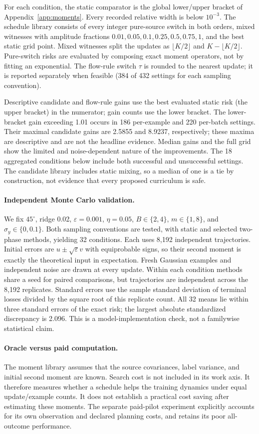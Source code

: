 For each condition, the static comparator is the global lower/upper bracket of Appendix~\ref{app:moments}. Every recorded relative width is below $10^{-3}$. The schedule library consists of every integer pure-source switch in both orders, mixed witnesses with amplitude fractions $0.01,0.05,0.1,0.25,0.5,0.75,1$, and the best static grid point. Mixed witnesses split the updates as $\lfloor K/2\rfloor$ and $K-\lfloor K/2\rfloor$. Pure-switch risks are evaluated by composing exact moment operators, not by fitting an exponential. The flow-rule switch $\tau$ is rounded to the nearest update; it is reported separately when feasible (384 of 432 settings for each sampling convention).

Descriptive candidate and flow-rule gains use the best evaluated static risk (the upper bracket) in the numerator; gain counts use the lower bracket. The lower-bracket gain exceeding 1.01 occurs in 186 per-example and 220 per-batch settings. Their maximal candidate gains are 2.5855 and 8.9237, respectively; these maxima are descriptive and are not the headline evidence. Median gains and the full grid show the limited and noise-dependent nature of the improvements. The 18 aggregated conditions below include both successful and unsuccessful settings. The candidate library includes static mixing, so a median of one is a tie by construction, not evidence that every proposed curriculum is safe.


\paragraph{Independent Monte Carlo validation.}
We fix $45^\circ$, ridge 0.02, $\varepsilon=0.001$, $\eta=0.05$, $B\in\{2,4\}$, $m\in\{1,8\}$, and $\sigma_y\in\{0,0.1\}$. Both sampling conventions are tested, with static and selected two-phase methods, yielding 32 conditions. Each uses 8,192 independent trajectories. Initial errors are $u\pm\sqrt\varepsilon v$ with equiprobable signs, so their second moment is exactly the theoretical input in expectation. Fresh Gaussian examples and independent noise are drawn at every update. Within each condition methods share a seed for paired comparisons, but trajectories are independent across the 8,192 replicates. Standard errors use the sample standard deviation of terminal losses divided by the square root of this replicate count. All 32 means lie within three standard errors of the exact risk; the largest absolute standardized discrepancy is 2.096. This is a model-implementation check, not a familywise statistical claim.

\paragraph{Oracle versus paid computation.}
The moment library assumes that the source covariances, label variance, and initial second moment are known. Search cost is not included in its work axis. It therefore measures whether a schedule helps the training dynamics under equal update/example counts. It does not establish a practical cost saving after estimating these moments. The separate paid-pilot experiment explicitly accounts for its own observation and declared planning costs, and retains its poor all-outcome performance.
